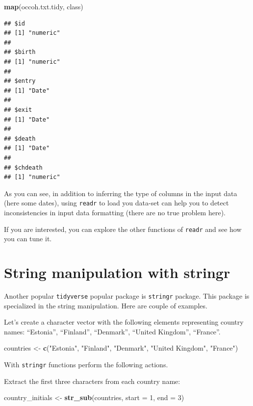 \documentclass[
]{book}
\newenvironment{Shaded}{\begin{snugshade}}{\end{snugshade}}
\newcommand{\AttributeTok}[1]{\textcolor[rgb]{0.13,0.29,0.53}{#1}}
\newcommand{\DecValTok}[1]{\textcolor[rgb]{0.00,0.00,0.81}{#1}}
\newcommand{\FunctionTok}[1]{\textcolor[rgb]{0.13,0.29,0.53}{\textbf{#1}}}
\newcommand{\NormalTok}[1]{#1}
\newcommand{\OtherTok}[1]{\textcolor[rgb]{0.56,0.35,0.01}{#1}}
\newcommand{\StringTok}[1]{\textcolor[rgb]{0.31,0.60,0.02}{#1}}
\theoremstyle{definition}
\theoremstyle{definition}
\theoremstyle{definition}
\theoremstyle{definition}
\theoremstyle{remark}
\begin{document}
\begin{Shaded}
\begin{Highlighting}[]
\FunctionTok{map}\NormalTok{(occoh.txt.tidy, class)}
\end{Highlighting}
\end{Shaded}

\begin{verbatim}
## $id
## [1] "numeric"
## 
## $birth
## [1] "numeric"
## 
## $entry
## [1] "Date"
## 
## $exit
## [1] "Date"
## 
## $death
## [1] "Date"
## 
## $chdeath
## [1] "numeric"
\end{verbatim}

As you can see, in addition to inferring the type of columns in the input data (here some dates), using \texttt{readr} to load you data-set can help you to detect inconsistencies in input data formatting (there are no true problem here).

If you are interested, you can explore the other functions of \texttt{readr} and see how you can tune it.

\section{String manipulation with stringr}\label{string-manipulation-with-stringr}

Another popular \texttt{tidyverse} popular package is \texttt{stringr} package. This package is specialized in the string manipulation. Here are couple of examples.

Let's create a character vector with the following elements representing country names: ``Estonia'', ``Finland'', ``Denmark'', ``United Kingdom'', ``France''.

\begin{Shaded}
\begin{Highlighting}[]
\NormalTok{countries }\OtherTok{\textless{}{-}} 
  \FunctionTok{c}\NormalTok{(}\StringTok{"Estonia"}\NormalTok{, }\StringTok{"Finland"}\NormalTok{, }\StringTok{"Denmark"}\NormalTok{, }\StringTok{"United Kingdom"}\NormalTok{, }\StringTok{"France"}\NormalTok{)}
\end{Highlighting}
\end{Shaded}

With \texttt{stringr} functions perform the following actions.

Extract the first three characters from each country name:

\begin{Shaded}
\begin{Highlighting}[]
\NormalTok{country\_initials }\OtherTok{\textless{}{-}} \FunctionTok{str\_sub}\NormalTok{(countries, }\AttributeTok{start =} \DecValTok{1}\NormalTok{, }\AttributeTok{end =} \DecValTok{3}\NormalTok{)}
\end{Highlighting}
\end{Shaded}
\end{document}
